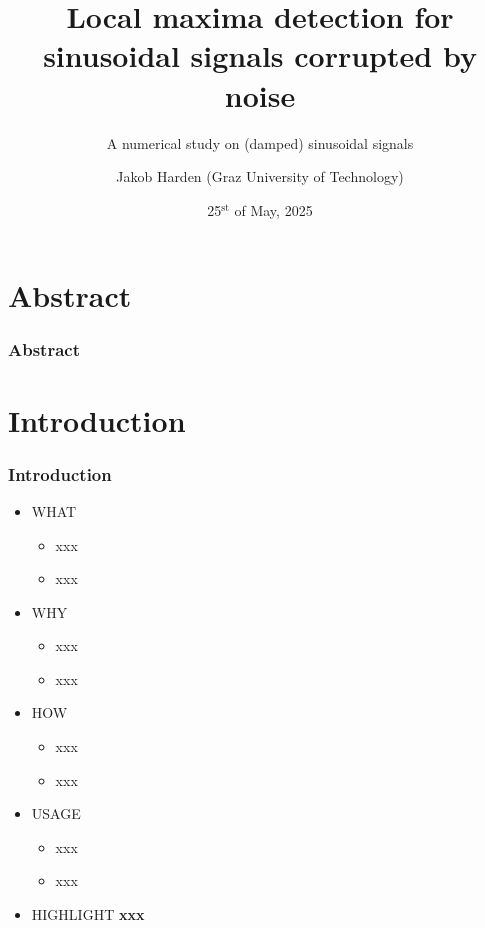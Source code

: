 \documentclass[11pt,aspectratio=169]{beamer}
\def\PresTitle{Local maxima detection for sinusoidal signals corrupted by noise}
\def\PresSubTitle{A numerical study on (damped) sinusoidal signals}
\def\PresDate{25${}^{\text{st}}$ of May, 2025}
\def\PresAuthorFirstname{Jakob}
\def\PresAuthorLastname{Harden}
\def\PresAuthor{\PresAuthorFirstname{} \PresAuthorLastname{}}
\def\PresAuthorAffiliation{Graz University of Technology}
\begin{document}
	\author{\PresAuthor{} (\PresAuthorAffiliation{})}
	\title{\PresTitle{}}
	\subtitle{\PresSubTitle{}}
	\date{\PresDate{}}
	\begin{frame}[plain]
		\maketitle
	\end{frame}
	\section*{Abstract}
	\begin{frame}
		\frametitle{Abstract}
		\begin{abstract}
		\end{abstract}
	\end{frame}
	\section{Introduction}
	\begin{frame}
		\frametitle{Introduction}
		\begin{itemize}
			\item \textcolor{RIPtitlecol}{WHAT}
			\begin{itemize}
				\item xxx
				\item xxx
			\end{itemize}
			\item \textcolor{RIPtitlecol}{WHY}
			\begin{itemize}
				\item xxx
				\item xxx
			\end{itemize}
			\item \textcolor{RIPtitlecol}{HOW}
			\begin{itemize}
				\item xxx
				\item xxx
			\end{itemize}
			\item \textcolor{RIPtitlecol}{USAGE}
				\begin{itemize}
					\item xxx
					\item xxx
				\end{itemize}
			\item \textcolor{RIPtitlecol}{HIGHLIGHT} \textbf{xxx}
		\end{itemize}
	\end{frame}
\end{document}
